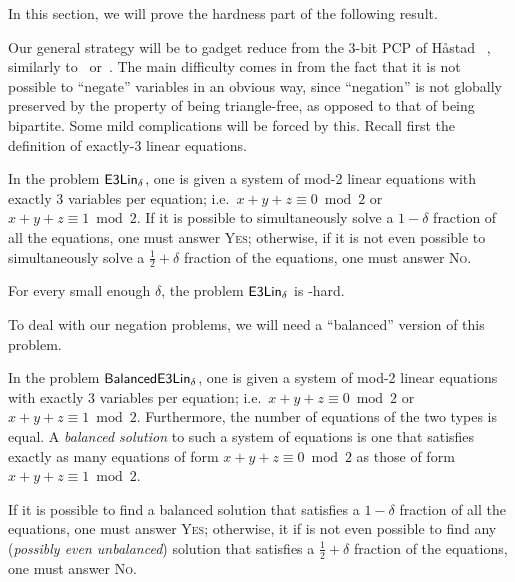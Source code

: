 \documentclass[a4paper,11pt, DIV=11]{scrartcl}
\DeclareMathOperator{\elin}{\textnormal{\textsf{E3Lin}}}
\DeclareMathOperator{\belin}{\textnormal{\textsf{BalancedE3Lin}}}
\theoremstyle{plain}
\theoremstyle{definition}
\begin{document}
In this section, we will prove the hardness part of the following result.

\main*

Our general strategy will be to gadget reduce from the 3-bit PCP of H{\aa}stad ~\cite{Hastad01}, similarly to~\cite{Trevisan00:sicomp} or~\cite{BGS:98}. The main difficulty comes in from the fact that it is not possible to ``negate'' variables in an obvious way, since ``negation'' is not globally preserved by the property of being triangle-free, as opposed to that of being bipartite. Some mild complications will be forced by this. Recall first the definition of exactly-3 linear equations.

\begin{definition}
    In the problem $\elin_\delta$, one is given a system of mod-2 linear
    equations with exactly 3 variables per equation; i.e.~$x + y + z \equiv 0
    \bmod 2$ or $x + y + z \equiv 1 \bmod 2$. If it is possible to
    simultaneously solve a $1 - \delta$ fraction of all the equations, one must
    answer \textsc{Yes}; otherwise, if it is not even possible to simultaneously solve a $\frac{1}{2} + \delta$ fraction of the equations, one must answer \textsc{No}.
\end{definition}

\begin{theorem}
    For every small enough $\delta$, the problem $\elin_\delta$ is \NP-hard.
\end{theorem}

To deal with our negation problems, we will need a ``balanced'' version of this problem.

\begin{definition}
    In the problem $\belin_\delta$, one is given a system of mod-2 linear equations with exactly 3 variables per equation; i.e.~$x + y + z \equiv 0 \bmod 2$ or $x + y + z \equiv 1 \bmod 2$. Furthermore, the number of equations of the two types is equal. 
    A \emph{balanced solution} to such a system of equations is one that satisfies exactly as many equations of form $x + y + z \equiv 0 \bmod 2$ as those of form $ x + y + z \equiv 1 \bmod 2$.
    
    If it is possible to find a balanced solution that satisfies a $1 - \delta$ fraction of all the equations, one must answer \textsc{Yes}; otherwise, it if is not even possible to find any (\emph{possibly even unbalanced}) solution that satisfies a $\frac{1}{2} + \delta$ fraction of the equations, one must answer \textsc{No}.
\end{definition}
\end{document}
